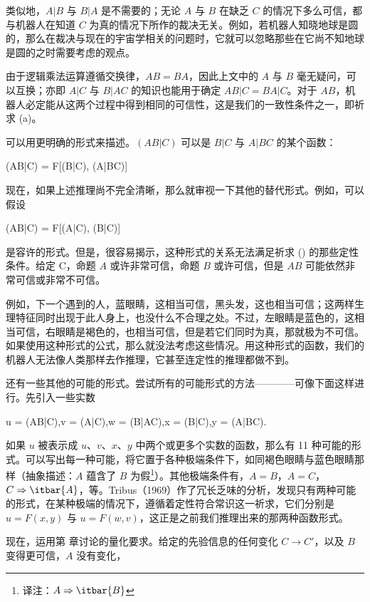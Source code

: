 类似地，$A|B$ 与 $B|A$ 是不需要的；无论 $A$ 与 $B$ 在缺乏 $C$ 的情况下多么可信，都与机器人在知道 $C$ 为真的情况下所作的裁决无关。例如，若机器人知晓地球是圆的，那么在裁决与现在的宇宙学相关的问题时，它就可以忽略那些在它尚不知地球是圆的之时需要考虑的观点。

由于逻辑乘法运算遵循交换律，$AB = BA$，因此上文中的 $A$ 与 $B$ 毫无疑问，可以互换；亦即 $A|C$ 与 $B|AC$ 的知识也能用于确定 $AB|C = BA|C$。对于 $AB$，机器人必定能从这两个过程中得到相同的可信性，这是我们的一致性条件之一，即祈求 (a)。

可以用更明确的形式来描述。$(AB|C)$ 可以是 $B|C$ 与 $A|BC$ 的某个函数：

\startformula
(AB|C) = F[(B|C), (A|BC)]
\stopformula

现在，如果上述推理尚不完全清晰，那么就审视一下其他的替代形式。例如，可以假设

\placeformula
\startformula
(AB|C) = F[(A|C), (B|C)]
\stopformula

是容许的形式。但是，很容易揭示，这种形式的关系无法满足祈求 () 的那些定性条件。给定 C，命题 $A$ 或许非常可信，命题 $B$ 或许可信，但是 $AB$ 可能依然非常可信或非常不可信。

例如，下一个遇到的人，蓝眼睛，这相当可信，黑头发，这也相当可信；这两样生理特征同时出现于此人身上，也没什么不合理之处。不过，左眼睛是蓝色的，这相当可信，右眼睛是褐色的，也相当可信，但是若它们同时为真，那就极为不可信。如果使用这种形式的公式，那么就没法考虑这些情况。用这种形式的函数，我们的机器人无法像人类那样去作推理，它甚至连定性的推理都做不到。

还有一些其他的可能的形式。尝试所有的可能形式的方法————可像下面这样进行。先引入一些实数

\placeformula
\startformula
u = (AB|C),\quad v = (A|C),\quad w = (B|AC),\quad x = (B|C),\quad y = (A|BC).
\stopformula

如果 $u$ 被表示成 $u$、$v$、$x$、$y$ 中两个或更多个实数的函数，那么有 11 种可能的形式。可以写出每一种可能，将它置于各种极端条件下，如同褐色眼睛与蓝色眼睛那样（抽象描述：$A$ 蕴含了 $B$ 为假\footnote{译注：$A\Rightarrow\itbar{B}$}）。其他极端条件有，$A = B$，$A = C$，$C\Rightarrow\itbar{A}$，等。Tribus（1969）作了冗长乏味的分析，发现只有两种可能的形式，在某种极端的情况下，遵循着定性符合常识这一祈求，它们分别是 $u = F(x, y)$ 与 $u = F(w, v)$，这正是之前我们推理出来的那两种函数形式。

现在，运用第  章讨论的量化要求。给定的先验信息的任何变化 $C\rightarrow C'$，以及 $B$ 变得更可信，$A$ 没有变化，

